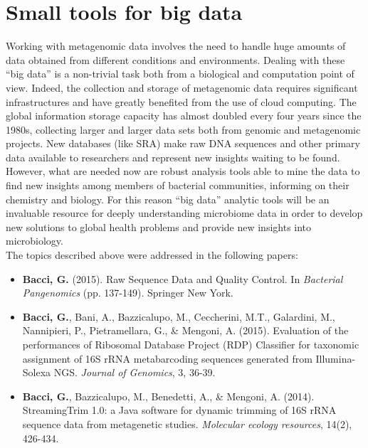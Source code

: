 \logvartrue
\chapter{Small tools for big data}
Working with metagenomic data involves the need to handle huge amounts of data obtained from different conditions and environments. Dealing with these ``big data'' is a non-trivial task both from a biological and computation point of view. Indeed, the collection and storage of metagenomic data requires significant infrastructures and have greatly benefited from the use of cloud computing. The global information storage capacity has almost doubled every four years since the 1980s, collecting larger and larger data sets both from genomic and metagenomic projects. New databases (like SRA) make raw DNA sequences and other primary data available to researchers and represent new insights waiting to be found. However, what are needed now are robust analysis tools able to mine the data to find new insights among members of bacterial communities, informing on their chemistry and biology. For this reason ``big data'' analytic tools will be an invaluable resource for deeply understanding microbiome data in order to develop new solutions to global health problems and provide new insights into microbiology.\\
The topics described above were addressed in the following papers:
\vspace{-2mm}
\begin{itemize}[nosep]
\item \textbf{Bacci, G.} (2015). Raw Sequence Data and Quality Control. In \textit{Bacterial Pangenomics} (pp. 137-149). Springer New York.
\item \textbf{Bacci, G.}, Bani, A., Bazzicalupo, M., Ceccherini, M.T., Galardini, M., Nannipieri, P., Pietramellara, G., \& Mengoni, A. (2015). Evaluation of the performances of Ribosomal Database Project (RDP) Classifier for taxonomic assignment of 16S rRNA metabarcoding sequences generated from Illumina-Solexa NGS. \textit{Journal of Genomics}, 3, 36-39.
\item \textbf{Bacci, G.}, Bazzicalupo, M., Benedetti, A., \& Mengoni, A. (2014). StreamingTrim 1.0: a Java software for dynamic trimming of 16S rRNA sequence data from metagenetic studies. \textit{Molecular ecology resources}, 14(2), 426-434.
\end{itemize}


